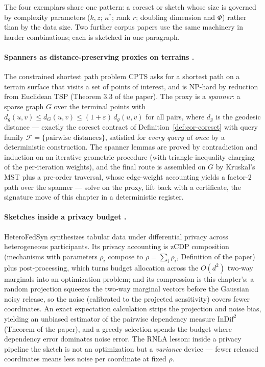 The four exemplars share one pattern: a coreset or sketch whose size is
governed by complexity parameters ($k, z$; $\kappa^*$; rank $r$;
doubling dimension and $\Phi$) rather than by the data size. Two
further corpus papers use the same machinery in harder combinations;
each is sketched in one paragraph.

\paragraph{Spanners as distance-preserving proxies on terrains
\citep{sigmod26-052}.}
The constrained shortest path problem CPTS asks for a shortest path on
a terrain surface that visits a set of points of interest, and is
NP-hard by reduction from Euclidean TSP (Theorem 3.3 of the paper).
The proxy is a \emph{spanner}: a sparse graph $G$ over the terminal
points with $d_g(u,v) \le d_G(u,v) \le (1+\varepsilon)\,d_g(u,v)$ for
all pairs, where $d_g$ is the geodesic distance --- exactly the coreset
contract of Definition~\ref{def:cor-coreset} with query family
$\mathcal{F} = \{\text{pairwise distances}\}$, satisfied for
\emph{every query at once} by a deterministic construction. The spanner
lemmas are proved by contradiction and induction on an iterative
geometric procedure (with triangle-inequality charging of the
per-iteration weights), and the final route is assembled on $G$ by
Kruskal's MST plus a pre-order traversal, whose edge-weight accounting
yields a factor-$2$ path over the spanner --- solve on the proxy, lift
back with a certificate, the signature move of this chapter in a
deterministic register.

\paragraph{Sketches inside a privacy budget \citep{sigmod26-127}.}
HeteroFedSyn synthesizes tabular data under differential privacy across
heterogeneous participants. Its privacy accounting is zCDP composition
(mechanisms with parameters $\rho_i$ compose to $\rho = \sum_i
\rho_i$, Definition of the paper) plus post-processing, which turns
budget allocation across the $O(d^2)$ two-way marginals into an
optimization problem; and its compression is this chapter's: a random
projection squeezes the two-way marginal vectors before the Gaussian
noisy release, so the noise (calibrated to the projected sensitivity)
covers fewer coordinates. An exact expectation calculation strips the
projection and noise bias, yielding an unbiased estimator of the
pairwise dependency measure $\mathrm{InDif}^2$ (Theorem of the paper),
and a greedy selection spends the budget where dependency error
dominates noise error. The RNLA lesson: inside a privacy pipeline the
sketch is not an optimization but a \emph{variance} device --- fewer
released coordinates means less noise per coordinate at fixed $\rho$.


